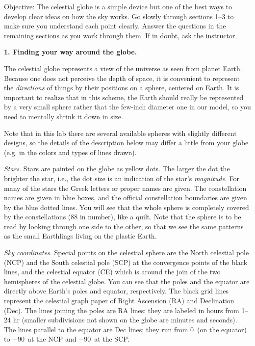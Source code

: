 

\bigskip

\noindent
{Objective:} The celestial globe is a simple device but one of the
best ways to develop clear ideas on how the sky works. Go slowly
through sections 1--3 to make sure you understand each point
clearly. Answer the questions in the remaining sections as you work
through them. If in doubt, ask the instructor.

\medskip
\noindent
{\bf 1. Finding your way around the globe.}

\medskip
\noindent
The celestial globe represents a view of the universe as seen from planet
Earth. Because one does not perceive the depth of space, it is
convenient to represent the \emph{directions} of things by their
positions on a sphere, centered on Earth. It is important to realize
that in this scheme, the Earth should really be represented by a
very small sphere rather that the few-inch diameter one in our
model, so you need to mentally shrink it down in size.

Note that in this lab there are several available spheres with
slightly different designs, so the details of the description below
may differ a little from your globe (e.g. in the colors and types of
lines drawn).

\medskip\noindent
\emph{Stars}. Stars are painted on the globe as yellow dots. The
larger the dot the brighter the star, i.e., the dot size is an
indication of the star's \emph{magnitude}. For many of the stars the
Greek letters or proper names are given.  The constellation names are
given in blue boxes, and the official constellation boundaries are
given by the blue dotted lines. You will see that the whole sphere is
completely covered by the constellations (88 in number), like a
quilt. Note that the sphere is to be read by looking through one side
to the other, so that we see the same patterns as the small Earthlings
living on the plastic Earth.

\medskip\noindent
\emph{Sky coordinates}. Special points on the celestial sphere are the
North celestial pole (NCP) and the South celestial pole (SCP) at the
convergence points of the black lines, and the celestial equator (CE)
which is around the join of the two hemispheres of the celestial
globe. You can see that the poles and the equator are directly above
Earth's poles and equator, respectively.  The black grid lines
represent the celestial graph paper of Right Ascension (RA) and
Declination (Dec). The lines joining the poles are RA lines: they are
labeled in hours from 1--24 hr (smaller subdivisions not shown on the
globe are minutes and seconds). The lines parallel to the equator are
Dec lines; they run from 0\deg\ (on the equator) to +90\deg\ at the
NCP and $-$90\deg\ at the SCP.

